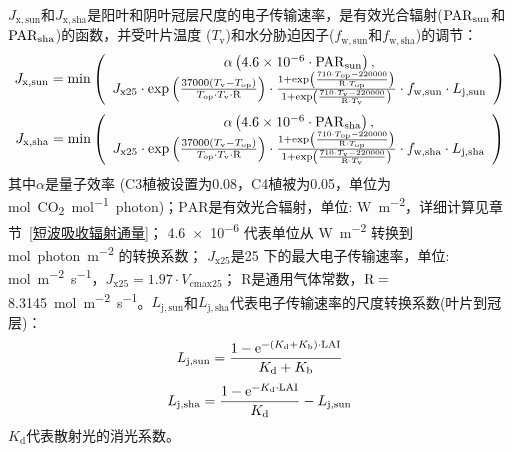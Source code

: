 $J_{\mathrm{x,sun}}$和$J_{\mathrm{x,sha}}$是阳叶和阴叶冠层尺度的电子传输速率，是有效光合辐射(${\rm PAR}_{\mathrm{sun}}$和${\rm PAR}_{\mathrm{sha}}$)的函数，并受叶片温度 ($T_{\mathrm{v}}$)和水分胁迫因子($f_{\mathrm{w,sun}}$和$f_{\mathrm{w,sha}}$)的调节：
\begin{equation}
\begin{aligned}
J_{\mathrm{x,sun}}=\min \left(\begin{array}{c} \alpha\left(4.6 \times 10^{-6} \cdot {\rm PAR}_{\mathrm{sun}}\right), \\
  J_{\mathrm{x25}} \cdot \exp\left(\frac{37000\left(T_{\mathrm{{v }}}-T_{\mathrm{o p}}\right)}{T_{\mathrm{o p}} \cdot T_{\mathrm{{v }}} \cdot {\rm R} } \right ) \cdot\frac{1+\exp\left(\frac{710 \cdot T_{\mathrm{o p}}-220000} {{\rm R} \cdot T_{\mathrm{o p}}}\right)}  {1+\exp\left(\frac{710 \cdot T_{\mathrm{v}}-220000} {{\rm R} \cdot T_{\mathrm{{v}}}}\right)} \cdot f_{\mathrm{w,sun}} \cdot L_{\mathrm{j,sun}}  \end{array} \right)
\end{aligned}
\end{equation}
\begin{equation}
\begin{aligned}
J_{\mathrm{x,sha}}=\min \left(\begin{array}{c} \alpha\left(4.6 \times 10^{-6} \cdot {\rm PAR}_{\mathrm{sha}}\right), \\
  J_{\mathrm{x25}} \cdot \exp\left(\frac{37000\left(T_{\mathrm{{v }}}-T_{\mathrm{o p}}\right)}{T_{\mathrm{o p}} \cdot T_{\mathrm{{v }}} \cdot {\rm R} } \right ) \cdot\frac{1+\exp\left(\frac{710 \cdot T_{\mathrm{o p}}-220000} {{\rm R} \cdot T_{\mathrm{o p}}}\right)}  {1+\exp\left(\frac{710 \cdot T_{\mathrm{v}}-220000} {{\rm R} \cdot T_{\mathrm{{v}}}}\right)} \cdot f_{\mathrm{w,sha}} \cdot L_{\mathrm{j,sha}}  \end{array} \right)
\end{aligned}
\end{equation}
其中$\alpha$是量子效率 (C3植被设置为0.08，C4植被为0.05，单位为\unit{mol.CO_2.mol^{-1}.photon})；${\mathrm {PAR}}$是有效光合辐射，单位: \unit{W.m^{-2}}，详细计算见章节~\ref{短波吸收辐射通量}；
\num{4.6e-6} 代表单位从 \unit{W.m^{-2}} 转换到 \unit{mol.photon.m^{-2}} 的转换系数；
$J_{\mathrm{x25}}$是25 \textcelsius 下的最大电子传输速率，单位: \unit{mol.m^{-2}.s^{-1}}，$J_{\mathrm{x25}}=1.97 \cdot V_{\mathrm{cmax 25}}$；
R是通用气体常数，${\rm R}=$ \qty{8.3145}{mol.m^{-2}.s^{-1}}。$L_{\mathrm{j,sun}}$和$L_{\mathrm{j,sha}}$代表电子传输速率的尺度转换系数(叶片到冠层)：
%
\begin{equation}\label{L_jsun}
L_{\mathrm{j,sun}}=\frac{1-{\mathrm e}^{-\left(K_{\mathrm{d}}+K_{\mathrm{b}}\right) \cdot {\rm LAI}}}{K_{\mathrm{d}}+K_{\mathrm{b}}}
\end{equation}
\begin{equation}\label{L_jsha}
L_{\mathrm{j,sha}}=\frac{1-{\mathrm e}^{-K_{\mathrm{d}}\cdot {\rm LAI}}}{K_{\mathrm{d}}} - L_{\mathrm{j,sun}}
\end{equation}
$K_{\mathrm{d}}$代表散射光的消光系数。

